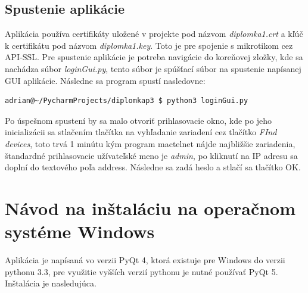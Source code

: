 \subsection{Spustenie aplikácie}
Aplikácia používa certifikáty uložené v projekte pod názvom \textit{diplomka1.crt} a kľúč k certifikátu pod názvom \textit{diplomka1.key}. Toto je pre spojenie s mikrotikom cez API-SSL. Pre spustenie aplikácie je potreba navigácie do koreňovej zložky, kde sa nachádza súbor \textit{loginGui.py}, tento súbor je spúšťací súbor na spustenie napísanej GUI aplikácie. Následne sa program spustí nasledovne:
\begin{lstlisting}[language=bash, frame=single, caption=Spustenie aplikácie,captionpos=b, showstringspaces=false, basicstyle=\footnotesize]
adrian@~/PycharmProjects/diplomkap3 $ python3 loginGui.py
\end{lstlisting}
Po úspešnom spustení by sa malo otvoriť prihlasovacie okno, kde po jeho inicializácii sa stlačením tlačítka na vyhľadanie zariadení cez tlačítko \textit{FInd devices}, toto trvá 1 minútu kým program mactelnet nájde najbližšie zariadenia, štandardné prihlasovacie užívateľské meno je \textit{admin}, po kliknutí na IP adresu sa doplní do textového poľa address. Následne sa zadá heslo a stlačí sa tlačítko OK. 
\section{Návod na inštaláciu na operačnom systéme Windows}
Aplikácia je napísaná vo verzii PyQt 4, ktorá existuje pre Windows do verzii pythonu 3.3, pre využitie vyšších verzií pythonu je nutné používať PyQt 5. Inštalácia je nasledujúca.
